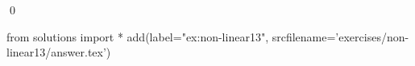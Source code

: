 
\begin{ex} 
  \label{ex:non-linear13}
  
  \qed
\end{ex} 
\begin{python0}
from solutions import *
add(label="ex:non-linear13",
    srcfilename='exercises/non-linear13/answer.tex') 
\end{python0}
